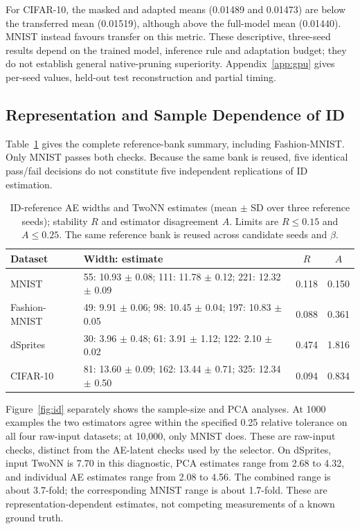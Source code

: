 \documentclass[make,article,submit,pdftex,moreauthors]{Definitions/mdpi}
\begin{document}
For CIFAR-10, the masked and adapted means (0.01489 and 0.01473)
are below the transferred mean (0.01519), although above the full-model
mean (0.01440). MNIST instead favours transfer on this metric.
These descriptive, three-seed results depend on the trained model,
inference rule and adaptation budget; they do not establish general
native-pruning superiority. Appendix~\ref{app:gpu} gives per-seed
values, held-out test reconstruction and partial timing.


\subsection{Representation and Sample Dependence of ID}
Table~\ref{tab:id} gives the complete reference-bank summary, including
Fashion-MNIST. Only MNIST passes both checks. Because the same bank is
reused, five identical pass/fail decisions do not constitute five
independent replications of ID estimation.

\begin{table}[H]\caption{ID-reference AE widths and TwoNN estimates (mean $\pm$ SD over three reference seeds); stability $R$ and estimator disagreement $A$. Limits are $R\le0.15$ and $A\le0.25$. The same reference bank is reused across candidate seeds and $\beta$.}\label{tab:id}
\footnotesize\begin{tabularx}{\textwidth}{lXcc}\toprule
Dataset & Width: estimate & $R$ & $A$ \\
\midrule
MNIST & 55: 10.93 $\pm$ 0.08; 111: 11.78 $\pm$ 0.12; 221: 12.32 $\pm$ 0.09 & 0.118 & 0.150 \\
Fashion-MNIST & 49: 9.91 $\pm$ 0.06; 98: 10.45 $\pm$ 0.04; 197: 10.83 $\pm$ 0.05 & 0.088 & 0.361 \\
dSprites & 30: 3.96 $\pm$ 0.48; 61: 3.91 $\pm$ 1.12; 122: 2.10 $\pm$ 0.02 & 0.474 & 1.816 \\
CIFAR-10 & 81: 13.60 $\pm$ 0.09; 162: 13.44 $\pm$ 0.71; 325: 12.34 $\pm$ 0.50 & 0.094 & 0.834 \\
\bottomrule\end{tabularx}\end{table}

Figure~\ref{fig:id} separately shows the sample-size and PCA analyses.
At 1000 examples the two estimators agree within the specified 0.25
relative tolerance on all four raw-input datasets; at 10,000, only MNIST
does. These are raw-input checks, distinct from the AE-latent checks used
by the selector. On dSprites, input TwoNN is 7.70 in this diagnostic,
PCA estimates range from 2.68 to 4.32, and individual AE estimates range
from 2.08 to 4.56. The combined range is about 3.7-fold; the corresponding
MNIST range is about 1.7-fold. These are representation-dependent
estimates, not competing measurements of a known ground truth.
\end{document}
